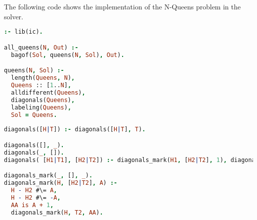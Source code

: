 \section{\eclipse}

The following code shows the implementation of the N-Queens problem in the
\eclipse solver.

\begin{lstlisting}[language=Prolog]
:- lib(ic).

all_queens(N, Out) :-
  bagof(Sol, queens(N, Sol), Out).

queens(N, Sol) :- 
  length(Queens, N),
  Queens :: [1..N],
  alldifferent(Queens),
  diagonals(Queens),
  labeling(Queens),
  Sol = Queens.
  
diagonals([H|T]) :- diagonals([H|T], T).

diagonals([], _).
diagonals(_, []).
diagonals( [H1|T1], [H2|T2]) :- diagonals_mark(H1, [H2|T2], 1), diagonals(T1, T2).

diagonals_mark(_, [], _).
diagonals_mark(H, [H2|T2], A) :-
  H - H2 #\= A,
  H - H2 #\= -A,
  AA is A + 1,
  diagonals_mark(H, T2, AA).
\end{lstlisting}
